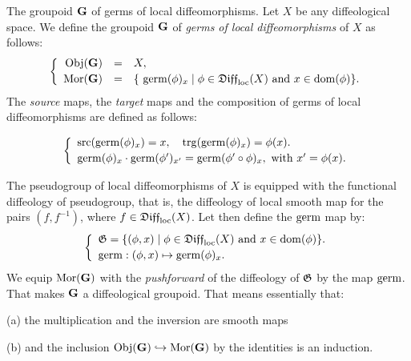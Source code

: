 \begin{Article}{The groupoid ${\mathbf G}$ of germs of local diffeomorphisms.}{}
  Let $X$ be any diffeological space.
  We define the groupoid ${\mathbf G}$ of \emph{germs of local diffeomorphisms} of $X$ as follows:
  $$
    \left\{
    \begin{array}{rcl}
    {\operatorname{Obj}}({\mathbf G}) & = & X, \\[.5ex]
    {\operatorname{Mor}}({\mathbf G}) & = & \{\ \operatorname{germ}(\phi)_x \mid \phi \in \mathfrak{Diff}_{\mathrm{loc}}(X) \mbox{ and } x \in \mathrm{dom}(\phi) \}.
    \end{array}
    \right.
  $$
  The \emph{source} maps,
  the \emph{target} maps and the composition of germs of local diffeomorphisms are defined as follows:

  $$
    \left\{
    \begin{array}{l}
    \mathrm{src}(\operatorname{germ}(\phi)_x) = x, \quad \mathrm{trg}(\operatorname{germ}(\phi)_x) = \phi(x). \\[.5ex]
    \operatorname{germ}(\phi)_x \cdot \operatorname{germ}(\phi')_{x'} = \operatorname{germ}(\phi' \circ \phi)_x, \text{ with } x'=\phi(x).
    \end{array}
    \right.
  $$

  The pseudogroup of local diffeomorphisms of $X$ is equipped with the functional diffeology of pseudogroup,
  that is,
  the diffeology of local smooth map for the pairs $(f,f^{-1})$,
  where $f \in \mathfrak{Diff}_{\mathrm{loc}}(X)$.
  Let then define the $\operatorname{germ}$ map by:
  $$
    \left\{
    \begin{array}{l}
    {\mathfrak G} = \{ (\phi,x) \mid \phi \in \mathfrak{Diff}_{\mathrm{loc}}(X) \mbox{ and } x \in \mathrm{dom}(\phi) \}. \\[.5ex]
    \operatorname{germ} : (\phi,x) \mapsto \operatorname{germ}(\phi)_x.
    \end{array}
    \right.
  $$
  We equip ${\operatorname{Mor}}({\mathbf G})$ with the {\itshape pushforward} of the diffeology of ${\mathfrak G}$ by the map $\operatorname{germ}$.
  That makes ${\mathbf G}$ a diffeological groupoid.
  That means essentially that:

  (a) the multiplication and the inversion are smooth maps

  (b) and the inclusion ${\operatorname{Obj}}({\mathbf G}) \hookrightarrow {\operatorname{Mor}}({\mathbf G})$ by the identities is an induction.
\end{Article}

